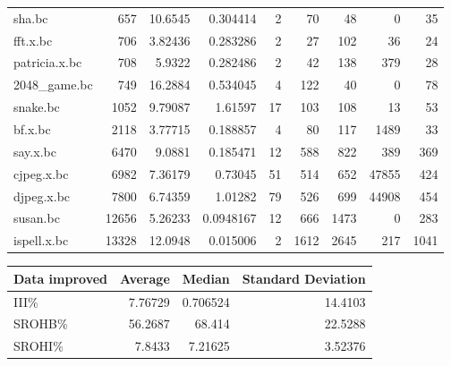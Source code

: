 \begin{tabular}{lrrrrrrrr}
 sha.bc               &            657 & 10.6545  &  0.304414  &    2 &     70 &           48 &     0 &    35 \\
 fft.x.bc             &            706 &  3.82436 &  0.283286  &    2 &     27 &          102 &    36 &    24 \\
 patricia.x.bc        &            708 &  5.9322  &  0.282486  &    2 &     42 &          138 &   379 &    28 \\
 2048\_game.bc         &            749 & 16.2884  &  0.534045  &    4 &    122 &           40 &     0 &    78 \\
 snake.bc             &           1052 &  9.79087 &  1.61597   &   17 &    103 &          108 &    13 &    53 \\
 bf.x.bc              &           2118 &  3.77715 &  0.188857  &    4 &     80 &          117 &  1489 &    33 \\
 say.x.bc             &           6470 &  9.0881  &  0.185471  &   12 &    588 &          822 &   389 &   369 \\
 cjpeg.x.bc           &           6982 &  7.36179 &  0.73045   &   51 &    514 &          652 & 47855 &   424 \\
 djpeg.x.bc           &           7800 &  6.74359 &  1.01282   &   79 &    526 &          699 & 44908 &   454 \\
 susan.bc             &          12656 &  5.26233 &  0.0948167 &   12 &    666 &         1473 &     0 &   283 \\
 ispell.x.bc          &          13328 & 12.0948  &  0.015006  &    2 &   1612 &         2645 &   217 &  1041 \\
\hline
\end{tabular}\begin{tabular}{lrrr}
\hline
 Data improved   &   Average &    Median &   Standard Deviation \\
\hline
 III\%            &   7.76729 &  0.706524 &             14.4103  \\
 SROHB\%          &  56.2687  & 68.414    &             22.5288  \\
 SROHI\%          &   7.8433  &  7.21625  &              3.52376 \\
\hline
\end{tabular}